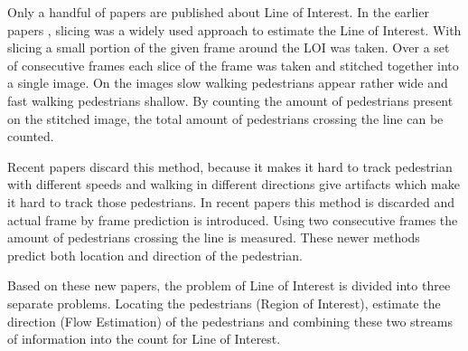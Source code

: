 Only a handful of papers are published about Line of Interest. In the earlier papers \cite{ma_counting_2016, cao_large_2015}, slicing was a widely used approach to estimate the Line of Interest. With slicing a small portion of the given frame around the LOI was taken. Over a set of consecutive frames each slice of the frame was taken and stitched together into a single image. On the images slow walking pedestrians appear rather wide and fast walking pedestrians shallow. By counting the amount of pedestrians present on the stitched image, the total amount of pedestrians crossing the line can be counted.

Recent papers discard this method, because it makes it hard to track pedestrian with different speeds and walking in different directions give artifacts which make it hard to track those pedestrians. In recent papers this method is discarded and actual frame by frame prediction is introduced. Using two consecutive frames the amount of pedestrians crossing the line is measured. These newer methods predict both location and direction of the pedestrian. 

Based on these new papers, the problem of Line of Interest is divided into three separate problems. Locating the pedestrians (Region of Interest), estimate the direction (Flow Estimation) of the pedestrians and combining these two streams of information into the count for Line of Interest.